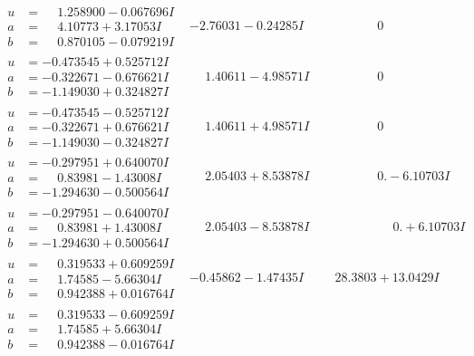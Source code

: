 \documentclass[1p]{elsarticle_modified}
\theoremstyle{definition}
\begin{document}
$$\begin{array}{c|c|c}
\begin{aligned}
u &= \phantom{-}1.258900 - 0.067696 I \\
a &= \phantom{-}4.10773 + 3.17053 I \\
b &= \phantom{-}0.870105 - 0.079219 I\end{aligned}
 & -2.76031 - 0.24285 I & \phantom{-0.000000 } 0 \\ \hline\begin{aligned}
u &= -0.473545 + 0.525712 I \\
a &= -0.322671 - 0.676621 I \\
b &= -1.149030 + 0.324827 I\end{aligned}
 & \phantom{-}1.40611 - 4.98571 I & \phantom{-0.000000 } 0 \\ \hline\begin{aligned}
u &= -0.473545 - 0.525712 I \\
a &= -0.322671 + 0.676621 I \\
b &= -1.149030 - 0.324827 I\end{aligned}
 & \phantom{-}1.40611 + 4.98571 I & \phantom{-0.000000 } 0 \\ \hline\begin{aligned}
u &= -0.297951 + 0.640070 I \\
a &= \phantom{-}0.83981 - 1.43008 I \\
b &= -1.294630 - 0.500564 I\end{aligned}
 & \phantom{-}2.05403 + 8.53878 I & \phantom{-0.000000 } 0. - 6.10703 I \\ \hline\begin{aligned}
u &= -0.297951 - 0.640070 I \\
a &= \phantom{-}0.83981 + 1.43008 I \\
b &= -1.294630 + 0.500564 I\end{aligned}
 & \phantom{-}2.05403 - 8.53878 I & \phantom{-0.000000 -}0. + 6.10703 I \\ \hline\begin{aligned}
u &= \phantom{-}0.319533 + 0.609259 I \\
a &= \phantom{-}1.74585 - 5.66304 I \\
b &= \phantom{-}0.942388 + 0.016764 I\end{aligned}
 & -0.45862 - 1.47435 I & \phantom{-}28.3803 + 13.0429 I \\ \hline\begin{aligned}
u &= \phantom{-}0.319533 - 0.609259 I \\
a &= \phantom{-}1.74585 + 5.66304 I \\
b &= \phantom{-}0.942388 - 0.016764 I\end{aligned}

\end{array}$$
\end{document}
